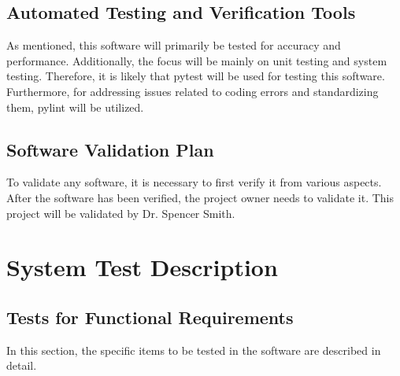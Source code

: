 \documentclass[12pt, titlepage]{article}
\begin{document}
\subsection{Automated Testing and Verification Tools}

As mentioned, this software will primarily be tested for accuracy and performance. Additionally, the focus will be mainly on unit testing and system testing. Therefore, it is likely that pytest will be used for testing this software. Furthermore, for addressing issues related to coding errors and standardizing them, pylint will be utilized.

\subsection{Software Validation Plan}

To validate any software, it is necessary to first verify it from various aspects. After the software has been verified, the project owner needs to validate it. This project will be validated by Dr. Spencer Smith.

\section{System Test Description}
	
\subsection{Tests for Functional Requirements}
In this section, the specific items to be tested in the software are described in detail.


		



					
					
\end{document}
